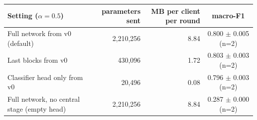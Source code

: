 \begin{tabular}{lrrc}
\toprule
Setting ($\alpha=0.5$) & parameters sent & MB per client per round & macro-F1 \\
\midrule
Full network from v0 (default) & 2,210,256 & 8.84 & 0.800 $\pm$ 0.005 (n=2) \\
Last blocks from v0 & 430,096 & 1.72 & 0.803 $\pm$ 0.003 (n=2) \\
Classifier head only from v0 & 20,496 & 0.08 & 0.796 $\pm$ 0.003 (n=2) \\
Full network, no central stage (empty head) & 2,210,256 & 8.84 & 0.287 $\pm$ 0.000 (n=2) \\
\bottomrule
\end{tabular}